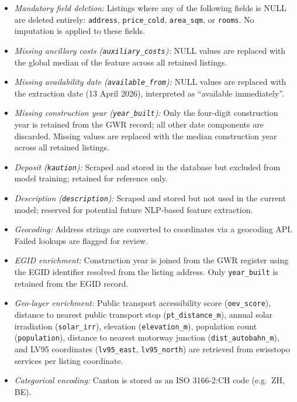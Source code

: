 \documentclass[11pt, a4paper]{article}
\begin{document}
\begin{itemize}
    \item \textit{Mandatory field deletion:} Listings where any of the following fields is NULL are deleted entirely: \texttt{address}, \texttt{price\_cold}, \texttt{area\_sqm}, or \texttt{rooms}. No imputation is applied to these fields.
    \item \textit{Missing ancillary costs (\texttt{auxiliary\_costs}):} NULL values are replaced with the global median of the feature across all retained listings.
    \item \textit{Missing availability date (\texttt{available\_from}):} NULL values are replaced with the extraction date (13 April 2026), interpreted as ``available immediately''.
    \item \textit{Missing construction year (\texttt{year\_built}):} Only the four-digit construction year is retained from the GWR record; all other date components are discarded. Missing values are replaced with the median construction year across all retained listings.
    \item \textit{Deposit (\texttt{kaution}):} Scraped and stored in the database but excluded from model training; retained for reference only.
    \item \textit{Description (\texttt{description}):} Scraped and stored but not used in the current model; reserved for potential future NLP-based feature extraction.
    \item \textit{Geocoding:} Address strings are converted to coordinates via a geocoding API. Failed lookups are flagged for review.
    \item \textit{EGID enrichment:} Construction year is joined from the GWR register using the EGID identifier resolved from the listing address. Only \texttt{year\_built} is retained from the EGID record.
    \item \textit{Geo-layer enrichment:} Public transport accessibility score (\texttt{oev\_score}), distance to nearest public transport stop (\texttt{pt\_distance\_m}), annual solar irradiation (\texttt{solar\_irr}), elevation (\texttt{elevation\_m}), population count (\texttt{population}), distance to nearest motorway junction (\texttt{dist\_autobahn\_m}), and LV95 coordinates (\texttt{lv95\_east}, \texttt{lv95\_north}) are retrieved from swisstopo services per listing coordinate.
    \item \textit{Categorical encoding:} Canton is stored as an ISO 3166-2:CH code (e.g.\ ZH, BE).
\end{itemize}
\end{document}
